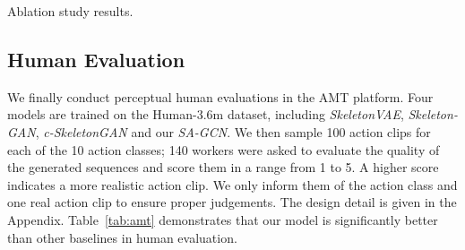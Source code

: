 \documentclass[runningheads]{llncs}
\begin{document}
\begin{table}[!h]
    \begin{minipage}{.55\textwidth}
    \centering
    \caption{\small{Ablation study results.}}
    \label{tab:ablation}
    \end{minipage}\hfill
    \begin{minipage}{.45\textwidth}
    \centering
    \caption{\small{AMT Evaluations}}
    \label{tab:amt}
    \end{minipage}
\end{table}

\subsection{Human Evaluation}
We finally conduct perceptual human evaluations in the AMT platform. Four models are trained on the Human-3.6m dataset, including {\it SkeletonVAE}, {\it Skeleton-GAN}, {\it c-SkeletonGAN} and our {\it SA-GCN}. We then sample 100 action clips for each of the 10 action classes; 140 workers were asked to evaluate the quality of the generated sequences and score them in a range from 1 to 5. A higher score indicates a more realistic action clip. We only inform them of the action class and one real action clip to ensure proper judgements. The design detail is given in the Appendix. Table~\ref{tab:amt} demonstrates that our model is significantly better than other baselines in human evaluation. 
\end{document}

